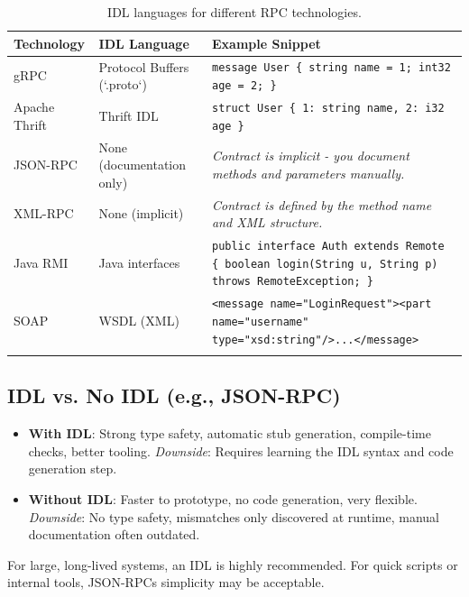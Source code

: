 \documentclass[a4paper]{article}
\begin{document}
\begin{longtable}{|p{3cm}|p{4cm}|p{8cm}|}
\hline
\textbf{Technology} & \textbf{IDL Language} & \textbf{Example Snippet} \\
\hline
gRPC & Protocol Buffers (`.proto`) & \texttt{message User \{ string name = 1; int32 age = 2; \}} \\
Apache Thrift & Thrift IDL & \texttt{struct User \{ 1: string name, 2: i32 age \}} \\
JSON-RPC & None (documentation only) & \textit{Contract is implicit - you document methods and parameters manually.} \\
XML-RPC & None (implicit) & \textit{Contract is defined by the method name and XML structure.} \\
Java RMI & Java interfaces & \texttt{public interface Auth extends Remote \{ boolean login(String u, String p) throws RemoteException; \}} \\
SOAP & WSDL (XML) & \texttt{<message name="LoginRequest"><part name="username" type="xsd:string"/>...</message>} \\
\hline
\caption{IDL languages for different RPC technologies.}
\label{tab:idl_examples}
\end{longtable}

\subsection{IDL vs. No IDL (e.g., JSON-RPC)}
\begin{itemize}
    \item \textbf{With IDL}: Strong type safety, automatic stub generation, compile-time checks, better tooling.  
        \textit{Downside}: Requires learning the IDL syntax and code generation step.
    \item \textbf{Without IDL}: Faster to prototype, no code generation, very flexible.  
        \textit{Downside}: No type safety, mismatches only discovered at runtime, manual documentation often outdated.
\end{itemize}
For large, long-lived systems, an IDL is highly recommended. For quick scripts or internal tools, JSON-RPCs simplicity may be acceptable.
\end{document}
